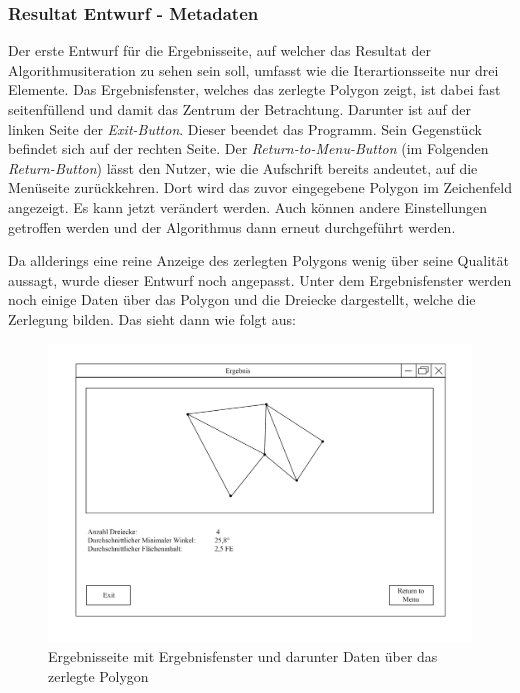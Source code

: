 \subsubsection{Resultat Entwurf - Metadaten}
Der erste Entwurf für die Ergebnisseite, auf welcher das Resultat der Algorithmusiteration zu sehen sein soll, umfasst wie die Iterartionsseite nur drei Elemente.
Das Ergebnisfenster, welches das zerlegte Polygon zeigt, ist dabei fast seitenfüllend und damit das Zentrum der Betrachtung.
Darunter ist auf der linken Seite der \emph{Exit-Button}. Dieser beendet das Programm. Sein Gegenstück befindet sich auf der rechten Seite. Der \emph{Return-to-Menu-Button} (im Folgenden \emph{Return-Button})  
lässt den Nutzer, wie die Aufschrift bereits andeutet, auf die Menüseite zurückkehren. Dort wird das zuvor eingegebene Polygon im Zeichenfeld angezeigt. Es kann jetzt verändert werden. Auch können andere Einstellungen getroffen werden 
und der Algorithmus dann erneut durchgeführt werden.

Da allderings eine reine Anzeige des zerlegten Polygons wenig über seine Qualität aussagt, wurde dieser Entwurf noch angepasst. Unter dem Ergebnisfenster werden noch einige Daten über das Polygon und die Dreiecke dargestellt, welche die Zerlegung bilden.
Das sieht dann wie folgt aus:

\begin{figure}[h]
    \includegraphics[width=1\textwidth]{bilder/ergebnis_metadaten.png}
    \caption[Entwurf Ergebnisseite mit Metadaten]{Ergebnisseite mit Ergebnisfenster und darunter Daten über das zerlegte Polygon}
    \label{fig:ergebnis_meta}
\end{figure}

